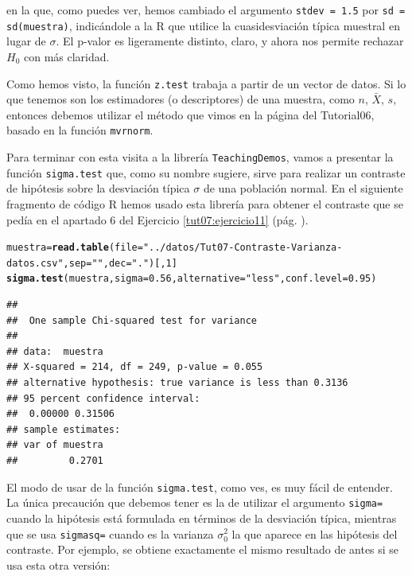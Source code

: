 \documentclass[10pt,a4paper]{article}\usepackage[]{graphicx}\usepackage[]{color}
\makeatletter
\newcommand{\hlnum}[1]{\textcolor[rgb]{0.686,0.059,0.569}{#1}}%
\newcommand{\hlstr}[1]{\textcolor[rgb]{0.192,0.494,0.8}{#1}}%
\newcommand{\hlstd}[1]{\textcolor[rgb]{0.345,0.345,0.345}{#1}}%
\newcommand{\hlkwb}[1]{\textcolor[rgb]{0.69,0.353,0.396}{#1}}%
\newcommand{\hlkwc}[1]{\textcolor[rgb]{0.333,0.667,0.333}{#1}}%
\newcommand{\hlkwd}[1]{\textcolor[rgb]{0.737,0.353,0.396}{\textbf{#1}}}%
\newenvironment{kframe}{%
 \def\at@end@of@kframe{}%
 \ifinner\ifhmode%
  \def\at@end@of@kframe{\end{minipage}}%
  \begin{minipage}{\columnwidth}%
 \fi\fi%
 \def\FrameCommand##1{\hskip\@totalleftmargin \hskip-\fboxsep
 \colorbox{shadecolor}{##1}\hskip-\fboxsep
     \hskip-\linewidth \hskip-\@totalleftmargin \hskip\columnwidth}%
 \MakeFramed {\advance\hsize-\width
   \@totalleftmargin\z@ \linewidth\hsize
   \@setminipage}}%
 {\par\unskip\endMakeFramed%
 \at@end@of@kframe}
\newenvironment{knitrout}{}{} %
\newcounter {cont01}
\makeatother
\begin{document}
en la que, como puedes ver, hemos cambiado el argumento {\tt stdev = 1.5} por {\tt sd = sd(muestra)}, indicándole a la R que utilice la cuasidesviación típica muestral en lugar de $\sigma$. El p-valor es ligeramente distinto, claro, y ahora nos permite rechazar $H_0$ con más claridad.

Como hemos visto, la función {\tt z.test} trabaja a partir de un vector de datos. Si lo que tenemos son los estimadores (o descriptores) de una muestra, como $n$, $\bar X$, $s$, entonces debemos utilizar el método que vimos en la página \pageref{tut06-tut06:subsubsec:CocinandoMuestras} del Tutorial06, basado en la función {\tt mvrnorm}.


Para terminar con esta visita a la librería {\tt TeachingDemos}, vamos a presentar la función {\tt sigma.test} que, como su nombre sugiere, sirve para realizar un contraste de hipótesis sobre la desviación típica $\sigma$ de una población normal. En el siguiente fragmento de código R hemos usado esta librería para obtener el contraste que se pedía en el apartado $6$ del Ejercicio \ref{tut07:ejercicio11}  (pág. \pageref{tut07:ejercicio11}).

\begin{knitrout}
\color{fgcolor}\begin{kframe}
\begin{alltt}
\hlstd{muestra} \hlkwb{=} \hlkwd{read.table}\hlstd{(}\hlkwc{file}\hlstd{=}\hlstr{"../datos/Tut07-Contraste-Varianza-datos.csv"}\hlstd{,}\hlkwc{sep}\hlstd{=}\hlstr{" "}\hlstd{,}\hlkwc{dec}\hlstd{=}\hlstr{"."}\hlstd{)[ ,}\hlnum{1}\hlstd{]}
\hlkwd{sigma.test}\hlstd{(muestra,}\hlkwc{sigma}\hlstd{=}\hlnum{0.56}\hlstd{,}\hlkwc{alternative}\hlstd{=}\hlstr{"less"}\hlstd{,}\hlkwc{conf.level}\hlstd{=}\hlnum{0.95}\hlstd{)}
\end{alltt}
\begin{verbatim}
## 
## 	One sample Chi-squared test for variance
## 
## data:  muestra
## X-squared = 214, df = 249, p-value = 0.055
## alternative hypothesis: true variance is less than 0.3136
## 95 percent confidence interval:
##  0.00000 0.31506
## sample estimates:
## var of muestra 
##         0.2701
\end{verbatim}
\end{kframe}
\end{knitrout}

El modo de usar de la función {\tt sigma.test}, como ves, es muy fácil de entender. La única precaución que debemos tener es la de utilizar el argumento {\tt sigma=} cuando la hipótesis está formulada en términos de la desviación típica, mientras que se usa {\tt sigmasq=} cuando es la varianza $\sigma_0^2$ la que aparece en las hipótesis del contraste. Por ejemplo, se obtiene exactamente el mismo resultado de antes si se usa esta otra versión:
\end{document}
